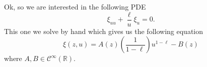 Ok, so we are interested in the following PDE
$$\xi_{uu}+\dfrac{\ell}{u}\xi_u=0.$$
This one we solve by hand which gives us the following equation
\begin{equation}
\xi{(z,u)}=A(z)\left(\dfrac{1}{1-\ell}\right)u^{1-\ell}-B(z)
\label{eq:xi}
\end{equation}
where $A,B\in\mathcal{C}^{\infty}(\mathbb{R})$.
